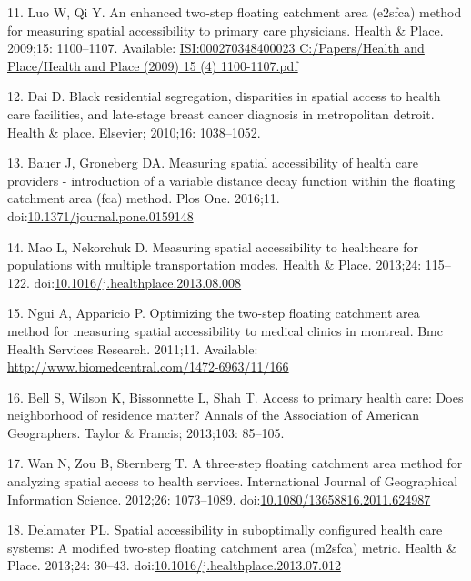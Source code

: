 \documentclass[10pt,letterpaper]{article}
\begin{document}
\hypertarget{ref-Luo2009}{}
11. Luo W, Qi Y. An enhanced two-step floating catchment area (e2sfca)
method for measuring spatial accessibility to primary care physicians.
Health \& Place. 2009;15: 1100--1107. Available:
\href{ISI:000270348400023\%0AC:/Papers/Health\%20and\%20Place/Health\%20and\%20Place\%20(2009)\%2015\%20(4)\%201100-1107.pdf}{ISI:000270348400023
C:/Papers/Health and Place/Health and Place (2009) 15 (4) 1100-1107.pdf}

\hypertarget{ref-Dai2010}{}
12. Dai D. Black residential segregation, disparities in spatial access
to health care facilities, and late-stage breast cancer diagnosis in
metropolitan detroit. Health \& place. Elsevier; 2010;16: 1038--1052.

\hypertarget{ref-Bauer2016}{}
13. Bauer J, Groneberg DA. Measuring spatial accessibility of health
care providers - introduction of a variable distance decay function
within the floating catchment area (fca) method. Plos One. 2016;11.
doi:\href{https://doi.org/10.1371/journal.pone.0159148}{10.1371/journal.pone.0159148}

\hypertarget{ref-Mao2013}{}
14. Mao L, Nekorchuk D. Measuring spatial accessibility to healthcare
for populations with multiple transportation modes. Health \& Place.
2013;24: 115--122.
doi:\href{https://doi.org/10.1016/j.healthplace.2013.08.008}{10.1016/j.healthplace.2013.08.008}

\hypertarget{ref-Ngui2011}{}
15. Ngui A, Apparicio P. Optimizing the two-step floating catchment area
method for measuring spatial accessibility to medical clinics in
montreal. Bmc Health Services Research. 2011;11. Available:
\url{http://www.biomedcentral.com/1472-6963/11/166}

\hypertarget{ref-Bell2013}{}
16. Bell S, Wilson K, Bissonnette L, Shah T. Access to primary health
care: Does neighborhood of residence matter? Annals of the Association
of American Geographers. Taylor \& Francis; 2013;103: 85--105.

\hypertarget{ref-Wan2012}{}
17. Wan N, Zou B, Sternberg T. A three-step floating catchment area
method for analyzing spatial access to health services. International
Journal of Geographical Information Science. 2012;26: 1073--1089.
doi:\href{https://doi.org/10.1080/13658816.2011.624987}{10.1080/13658816.2011.624987}

\hypertarget{ref-Delamater2013}{}
18. Delamater PL. Spatial accessibility in suboptimally configured
health care systems: A modified two-step floating catchment area
(m2sfca) metric. Health \& Place. 2013;24: 30--43.
doi:\href{https://doi.org/10.1016/j.healthplace.2013.07.012}{10.1016/j.healthplace.2013.07.012}
\end{document}
